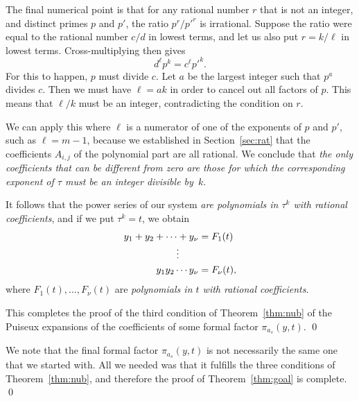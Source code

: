 \documentclass{article}
\theoremstyle{plain}
\theoremstyle{definition}
\begin{document}

\noindent
The final numerical point is that for any rational number $r$ that is not an integer, and distinct primes $p$ and $p'$, the ratio $p^r /p'^r$ is irrational.  Suppose the ratio were equal to the rational number $c/d$ in lowest terms, and let us also put $r = k/\ell$ in lowest terms.  Cross-multiplying then gives 
\[
d^{\ell} p^k = c^{\ell} p'^k.
\]
For this to happen, $p$ must divide $c$.  Let $a$ be the largest integer such that $p^a$ divides $c$.  Then we must have $\ell = ak$ in order to cancel out all factors of $p$.  This means that $\ell/k$ must be an integer, contradicting the condition on $r$.  
%
  
We can apply this where $\ell$ is a numerator of one of the exponents of $p$ and $p'$, such as $\ell = m-1$, because we established in Section~\ref{sec:rat} that the coefficients $A_{i,j}$ of the polynomial part are all rational.  We conclude that \emph{the only coefficients that can be different from zero are those for which the corresponding exponent of
$\tau$ must be an integer divisible by~$k$}.

It follows that the power
series of our system \emph{are polynomials in $\tau^k$ with rational
coefficients}, and if we put $\tau^k = t$, we obtain
\begin{align*}
y_1 + y_2 +\cdots+ y_\nu &= F_1(t)
\\[-\jot]  
\vdots\qquad &
\\
y_1 y_2 \cdots y_\nu &= F_\nu(t),    
\end{align*}
where $F_1(t),\dots,F_{\nu}(t)$ are \emph{polynomials in $t$
with rational coefficients}.


This completes the proof of the third condition of Theorem~\ref{thm:nub} of the Puiseux
expansions of the coefficients of some formal factor $\pi_{a_s}(y,t)$.
\qed

\bigskip
We note that the final formal factor $\pi_{a_s}(y,t)$ is not necessarily the same one that we started with.
All we needed was that it fulfills the three
conditions of Theorem~\ref{thm:nub}, and therefore the proof of Theorem~\ref{thm:goal} is complete.
\qed
\end{document}
